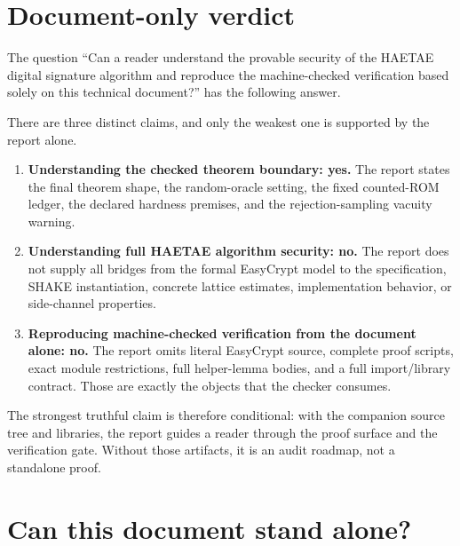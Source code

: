 \documentclass[11pt]{report}
\theoremstyle{definition}
\theoremstyle{plain}
\begin{document}
\section{Document-only verdict}

The question ``Can a reader understand the provable security of the HAETAE
digital signature algorithm and reproduce the machine-checked verification
based solely on this technical document?'' has the following answer.

\begin{center}
\end{center}

There are three distinct claims, and only the weakest one is supported by the
report alone.

\begin{enumerate}
\item \textbf{Understanding the checked theorem boundary: yes.}  The report
states the final theorem shape, the random-oracle setting, the fixed counted-ROM
ledger, the declared hardness premises, and the rejection-sampling vacuity
warning.
\item \textbf{Understanding full HAETAE algorithm security: no.}  The report
does not supply all bridges from the formal EasyCrypt model to the specification,
SHAKE instantiation, concrete lattice estimates, implementation behavior, or
side-channel properties.
\item \textbf{Reproducing machine-checked verification from the document alone:
no.}  The report omits literal EasyCrypt source, complete proof scripts, exact
module restrictions, full helper-lemma bodies, and a full import/library
contract.  Those are exactly the objects that the checker consumes.
\end{enumerate}

The strongest truthful claim is therefore conditional: with the companion
source tree and libraries, the report guides a reader through the proof surface
and the verification gate.  Without those artifacts, it is an audit roadmap, not
a standalone proof.

\section{Can this document stand alone?}
\end{document}
